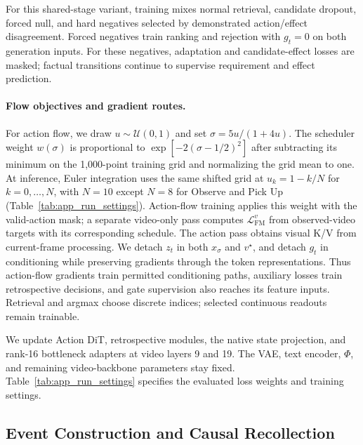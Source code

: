 For this shared-stage variant, training mixes normal retrieval, candidate dropout, forced null, and hard negatives selected by demonstrated action/effect disagreement.
Forced negatives train ranking and rejection with $g_t=0$ on both generation inputs.
For these negatives, adaptation and candidate-effect losses are masked; factual transitions continue to supervise requirement and effect prediction.

\paragraph{Flow objectives and gradient routes.}
For action flow, we draw $u\sim\mathcal U(0,1)$ and set $\sigma=5u/(1+4u)$.
The scheduler weight $w(\sigma)$ is proportional to $\exp[-2(\sigma-1/2)^2]$ after subtracting its minimum on the 1,000-point training grid and normalizing the grid mean to one.
At inference, Euler integration uses the same shifted grid at $u_k=1-k/N$ for $k=0,\ldots,N$, with $N=10$ except $N=8$ for Observe and Pick Up (Table~\ref{tab:app_run_settings}).
Action-flow training applies this weight with the valid-action mask; a separate video-only pass computes $\mathcal L_{\mathrm{FM}}^v$ from observed-video targets with its corresponding schedule.
The action pass obtains visual K/V from current-frame processing.
We detach $z_t$ in both $x_\sigma$ and $v^\star$, and detach $g_t$ in conditioning while preserving gradients through the token representations.
Thus action-flow gradients train permitted conditioning paths, auxiliary losses train retrospective decisions, and gate supervision also reaches its feature inputs.
Retrieval and argmax choose discrete indices; selected continuous readouts remain trainable.

We update Action DiT, retrospective modules, the native state projection, and rank-16 bottleneck adapters at video layers 9 and 19.
The VAE, text encoder, $\Phi$, and remaining video-backbone parameters stay fixed.
Table~\ref{tab:app_run_settings} specifies the evaluated loss weights and training settings.

\subsection{Event Construction and Causal Recollection}
\label{app:memory_details}
\label{app:execution}

